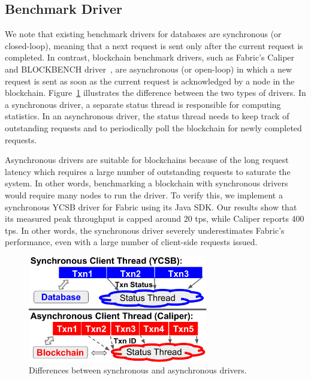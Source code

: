 \subsection{Benchmark Driver}
We note that existing benchmark drivers for databases are synchronous (or closed-loop), meaning that a next
request is sent only after the current request is completed. In contrast, blockchain benchmark
drivers, such as Fabric's Caliper and BLOCKBENCH driver~\cite{dinh2017blockbench}, are asynchronous (or
open-loop) in which a new request is sent as soon as the current request is acknowledged by a
node in the blockchain. 
Figure~\ref{diagram:twin:driver_diff} illustrates the difference between the two types of drivers. 
In a synchronous driver, a separate status thread is responsible for computing statistics. In an
asynchronous driver, the status thread needs to keep track of outstanding requests and to periodically poll
the blockchain for newly completed requests. 

Asynchronous drivers are suitable for blockchains because of the long request latency which requires a large number of outstanding requests to saturate the system. In other words, benchmarking a blockchain with synchronous drivers would require many nodes to run the driver. 
To verify this, we implement a synchronous YCSB driver for Fabric using its Java SDK.  
Our results show that its measured peak throughput is capped around 20 tps, while Caliper reports 400 tps. 
In other words, the synchronous driver severely underestimates Fabric's performance, even with a large number of client-side requests issued.

\begin{figure}
    \centering
    \includegraphics[width=0.7\textwidth]{diagram/twin/driver_diff.pdf}
    \caption{Differences between synchronous and asynchronous drivers.}
    \label{diagram:twin:driver_diff} 
\end{figure}

